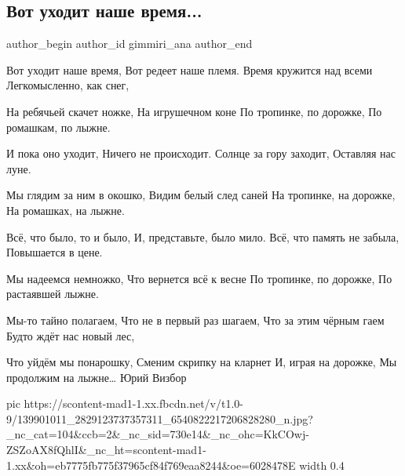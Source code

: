  
 
 
 
 
\subsection{Вот уходит наше время...}
\label{sec:17_01_2021.fb.gimmiri_ana.1.vremja}
\ifcmt
  author_begin
   author_id gimmiri_ana
  author_end
\fi

\obeycr
Вот уходит наше время,
Вот редеет наше племя.
Время кружится над всеми
Легкомысленно, как снег,

На ребячьей скачет ножке,
На игрушечном коне
По тропинке, по дорожке,
По ромашкам, по лыжне.

И пока оно уходит,
Ничего не происходит.
Солнце за гору заходит,
Оставляя нас луне.

Мы глядим за ним в окошко,
Видим белый след саней
На тропинке, на дорожке,
На ромашках, на лыжне.

Всё, что было, то и было,
И, представьте, было мило.
Всё, что память не забыла,
Повышается в цене.

Мы надеемся немножко,
Что вернется всё к весне
По тропинке, по дорожке,
По растаявшей лыжне.

Мы-то тайно полагаем,
Что не в первый раз шагаем,
Что за этим чёрным гаем
Будто ждёт нас новый лес,

Что уйдём мы понарошку,
Сменим скрипку на кларнет
И, играя на дорожке,
Мы продолжим на лыжне…                                             Юрий Визбор
\restorecr

\ifcmt
  pic https://scontent-mad1-1.xx.fbcdn.net/v/t1.0-9/139901011_2829123737357311_6540822217206828280_n.jpg?_nc_cat=104&ccb=2&_nc_sid=730e14&_nc_ohc=KkCOwj-ZSZoAX8fQhlI&_nc_ht=scontent-mad1-1.xx&oh=eb7775fb775f37965cf84f769eaa8244&oe=6028478E
  width 0.4
\fi

